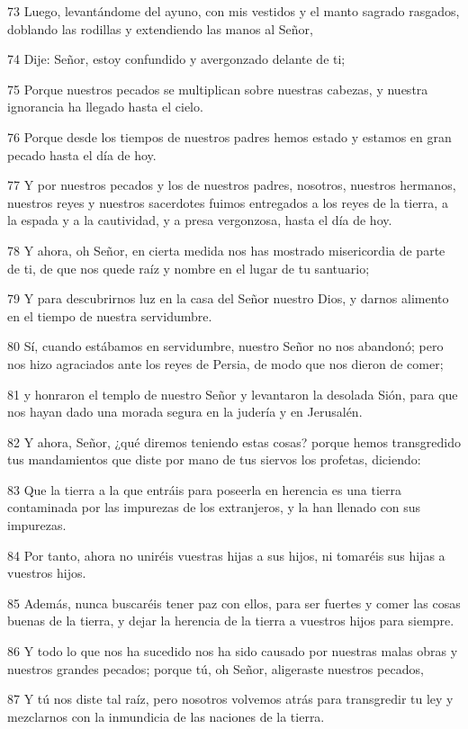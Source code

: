 \par 73 Luego, levantándome del ayuno, con mis vestidos y el manto sagrado rasgados, doblando las rodillas y extendiendo las manos al Señor,
\par 74 Dije: Señor, estoy confundido y avergonzado delante de ti;
\par 75 Porque nuestros pecados se multiplican sobre nuestras cabezas, y nuestra ignorancia ha llegado hasta el cielo.
\par 76 Porque desde los tiempos de nuestros padres hemos estado y estamos en gran pecado hasta el día de hoy.
\par 77 Y por nuestros pecados y los de nuestros padres, nosotros, nuestros hermanos, nuestros reyes y nuestros sacerdotes fuimos entregados a los reyes de la tierra, a la espada y a la cautividad, y a presa vergonzosa, hasta el día de hoy.
\par 78 Y ahora, oh Señor, en cierta medida nos has mostrado misericordia de parte de ti, de que nos quede raíz y nombre en el lugar de tu santuario;
\par 79 Y para descubrirnos luz en la casa del Señor nuestro Dios, y darnos alimento en el tiempo de nuestra servidumbre.
\par 80 Sí, cuando estábamos en servidumbre, nuestro Señor no nos abandonó; pero nos hizo agraciados ante los reyes de Persia, de modo que nos dieron de comer;
\par 81 y honraron el templo de nuestro Señor y levantaron la desolada Sión, para que nos hayan dado una morada segura en la judería y en Jerusalén.
\par 82 Y ahora, Señor, ¿qué diremos teniendo estas cosas? porque hemos transgredido tus mandamientos que diste por mano de tus siervos los profetas, diciendo:
\par 83 Que la tierra a la que entráis para poseerla en herencia es una tierra contaminada por las impurezas de los extranjeros, y la han llenado con sus impurezas.
\par 84 Por tanto, ahora no uniréis vuestras hijas a sus hijos, ni tomaréis sus hijas a vuestros hijos.
\par 85 Además, nunca buscaréis tener paz con ellos, para ser fuertes y comer las cosas buenas de la tierra, y dejar la herencia de la tierra a vuestros hijos para siempre.
\par 86 Y todo lo que nos ha sucedido nos ha sido causado por nuestras malas obras y nuestros grandes pecados; porque tú, oh Señor, aligeraste nuestros pecados,
\par 87 Y tú nos diste tal raíz, pero nosotros volvemos atrás para transgredir tu ley y mezclarnos con la inmundicia de las naciones de la tierra.
